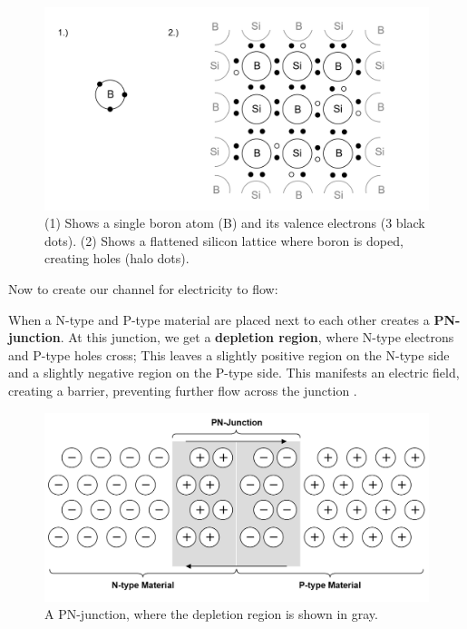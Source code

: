 \vspace{-1em}
\begin{figure}[ht!]
  \centering
  \includegraphics[width=\textwidth]{Sections/circuits/p-type.png}
  \caption{(1) Shows a single boron atom (B) and its valence electrons (3 black dots).
  (2) Shows a flattened silicon lattice where boron is doped, creating holes (halo dots). }
  \label{fig:doping3}
\end{figure}

\newpage 

\noindent
Now to create our channel for electricity to flow:
\begin{Def}

    \label{def:n_p_junctions}

   When a N-type and P-type material are placed next to each other 
   creates a \textbf{PN-junction}. At this junction, we get a \textbf{depletion region},
   where N-type electrons and P-type holes cross; This leaves a 
   slightly positive region on the N-type side and a slightly negative region on the P-type side.
   This manifests an electric field, creating a barrier, preventing further flow across the junction \cite{engineermindset2024mosfet}.
\end{Def}

\noindent
\begin{figure}[ht!]
  \centering
  \includegraphics[width=\textwidth]{Sections/circuits/pn-junction.png}
  \caption{A PN-junction, where the depletion region is shown in gray.}
  \label{fig:pn-junction}
\end{figure}

